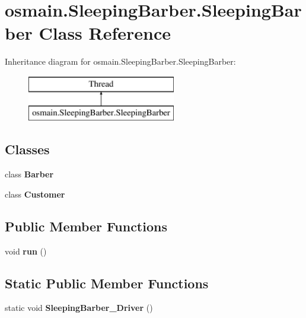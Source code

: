 \hypertarget{classosmain_1_1_sleeping_barber_1_1_sleeping_barber}{}\section{osmain.\+Sleeping\+Barber.\+Sleeping\+Barber Class Reference}
\label{classosmain_1_1_sleeping_barber_1_1_sleeping_barber}
Inheritance diagram for osmain.\+Sleeping\+Barber.\+Sleeping\+Barber\+:\begin{figure}[H]
\begin{center}
\leavevmode
\includegraphics[height=2.000000cm]{classosmain_1_1_sleeping_barber_1_1_sleeping_barber}
\end{center}
\end{figure}
\subsection*{Classes}
\begin{DoxyCompactItemize}
\item 
class {\bfseries Barber}
\item 
class {\bfseries Customer}
\end{DoxyCompactItemize}
\subsection*{Public Member Functions}
\begin{DoxyCompactItemize}
\item 
void {\bfseries run} ()\hypertarget{classosmain_1_1_sleeping_barber_1_1_sleeping_barber_ad6de70764d9359d52bac76909c8b98a9}{}\label{classosmain_1_1_sleeping_barber_1_1_sleeping_barber_ad6de70764d9359d52bac76909c8b98a9}

\end{DoxyCompactItemize}
\subsection*{Static Public Member Functions}
\begin{DoxyCompactItemize}
\item 
static void {\bfseries Sleeping\+Barber\+\_\+\+Driver} ()\hypertarget{classosmain_1_1_sleeping_barber_1_1_sleeping_barber_ac8cd894b2681123e24c146265a7cc126}{}\label{classosmain_1_1_sleeping_barber_1_1_sleeping_barber_ac8cd894b2681123e24c146265a7cc126}

\end{DoxyCompactItemize}
